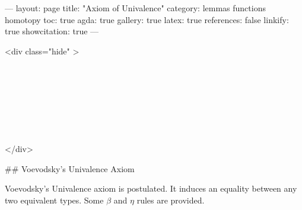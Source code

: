 ---
layout: page
title: "Axiom of Univalence"
category: lemmas functions homotopy
toc: true
agda: true
gallery: true
latex: true
references: false
linkify: true
showcitation: true
---

<div class="hide" >
\begin{code}%
\>[0]\AgdaSymbol{\{-\#}\AgdaSpace{}%
\AgdaSpace{}%
\AgdaSpace{}%
\AgdaSymbol{\#-\}}\<%
\\
\>[0]\AgdaSpace{}%
\AgdaSpace{}%
\<%
\\
\>[0]\AgdaSpace{}%
\AgdaSpace{}%
\<%
\\
%
\\[\AgdaEmptyExtraSkip]%
\>[0]\AgdaSpace{}%
\AgdaSpace{}%
\<%
\\
\>[0]\AgdaSpace{}%
\AgdaSpace{}%
\<%
\\
\>[0]\AgdaSpace{}%
\AgdaSpace{}%
\<%
\end{code}
</div>

## Voevodsky's Univalence Axiom

Voevodsky's Univalence axiom is postulated. It induces an equality between any
two equivalent types. Some $β$ and $η$ rules are provided.

\begin{code}%
\>[0]\AgdaSpace{}%
\AgdaSpace{}%
\AgdaSymbol{\{}\AgdaSymbol{\}}\AgdaSpace{}%
\AgdaSymbol{\{}\AgdaSpace{}%
\AgdaSpace{}%
\AgdaSymbol{:}\AgdaSpace{}%
\AgdaSpace{}%
\AgdaSymbol{\}}\AgdaSpace{}%
\<%
\end{code}

